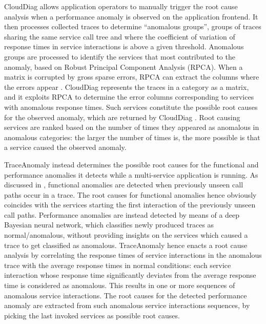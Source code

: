 CloudDiag \cite{41_Mi2013_PerformanceDiagnosisCloud} allows application operators to manually trigger the root cause analysis when a performance anomaly is observed on the application frontend.
It then processes collected traces to determine \enquote{anomalous groups}, \viz groups of traces sharing the same service call tree and where the coefficient of variation \cite{Neil2010_CoefficientVariation} of response times in service interactions is above a given threshold. 
Anomalous groups are processed to identify the services that most contributed to the anomaly, based on Robust Principal Component Analysis (RPCA). 
When a matrix is corrupted by gross sparse errors, RPCA can extract the columns where the errors appear \cite{Candes2009_RobustPrincipalComponentAnalysis}.
CloudDiag \cite{41_Mi2013_PerformanceDiagnosisCloud} represents the traces in a category as a matrix, and it exploits RPCA to determine the error columns corresponding to services with anomalous response times.
Such services constitute the possible root causes for the observed anomaly, which are returned by CloudDiag \cite{41_Mi2013_PerformanceDiagnosisCloud}.
Root causing services are ranked based on the number of times they appeared as anomalous in anomalous categories: the larger the number of times is, the more possible is that a service caused the observed anomaly.

TraceAnomaly \cite{16_Liu2020_TraceAnomaly} instead determines the possible root causes for the functional and performance anomalies it detects while a multi-service application is running.
As discussed in , functional anomalies are detected when previously unseen call paths occur in a trace.
The root causes for functional anomalies hence obviously coincides with the services starting the first interaction of the previously unseen call paths.
Performance anomalies are instead detected by means of a deep Bayesian neural network, which classifies newly produced traces as normal/anomalous, without providing insights on the services which caused a trace to get classified as anomalous.
TraceAnomaly \cite{16_Liu2020_TraceAnomaly} hence enacts a root cause analysis by correlating the response times of service interactions in the anomalous trace with the average response times in normal conditions: each service interaction whose response time significantly deviates from the average response time is considered as anomalous.
This results in one or more sequences of anomalous service interactions.
The root causes for the detected performance anomaly are extracted from such anomalous service interactions sequences, by picking the last invoked services as possible root causes.

